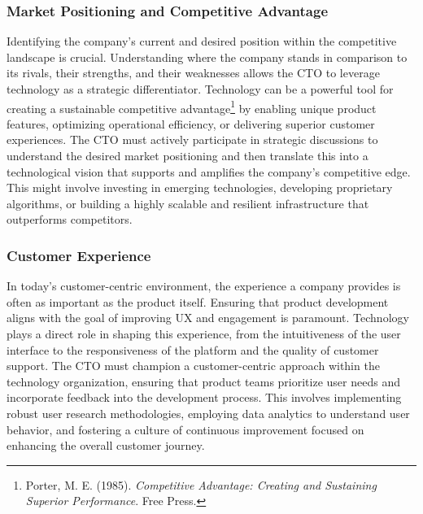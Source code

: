 \subsubsection{Market Positioning and Competitive Advantage}
Identifying the company's current and desired position within the competitive landscape is crucial. Understanding where the company stands in comparison to its rivals, their strengths, and their weaknesses allows the \gls{CTO} to leverage technology as a strategic differentiator. Technology can be a powerful tool for creating a sustainable competitive advantage\footnote{Porter, M. E. (1985). \textit{Competitive Advantage: Creating and Sustaining Superior Performance}. Free Press.} by enabling unique product features, optimizing operational efficiency, or delivering superior customer experiences. The \gls{CTO} must actively participate in strategic discussions to understand the desired market positioning and then translate this into a technological vision that supports and amplifies the company's competitive edge. This might involve investing in emerging technologies, developing proprietary algorithms, or building a highly scalable and resilient infrastructure that outperforms competitors.

\subsubsection{Customer Experience}
In today's customer-centric environment, the experience a company provides is often as important as the product itself. Ensuring that product development aligns with the goal of improving \gls{UX} and engagement is paramount. Technology plays a direct role in shaping this experience, from the intuitiveness of the user interface to the responsiveness of the platform and the quality of customer support. The \gls{CTO} must champion a customer-centric approach within the technology organization, ensuring that product teams prioritize user needs and incorporate feedback into the development process. This involves implementing robust user research methodologies, employing data analytics to understand user behavior, and fostering a culture of continuous improvement focused on enhancing the overall customer journey.

